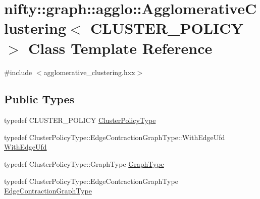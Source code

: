 \hypertarget{classnifty_1_1graph_1_1agglo_1_1AgglomerativeClustering}{}\section{nifty\+:\+:graph\+:\+:agglo\+:\+:Agglomerative\+Clustering$<$ C\+L\+U\+S\+T\+E\+R\+\_\+\+P\+O\+L\+I\+CY $>$ Class Template Reference}
\label{classnifty_1_1graph_1_1agglo_1_1AgglomerativeClustering}


{\ttfamily \#include $<$agglomerative\+\_\+clustering.\+hxx$>$}

\subsection*{Public Types}
\begin{DoxyCompactItemize}
\item 
typedef C\+L\+U\+S\+T\+E\+R\+\_\+\+P\+O\+L\+I\+CY \hyperlink{classnifty_1_1graph_1_1agglo_1_1AgglomerativeClustering_a3a678ecd37725f2c0f8ec56857768034}{Cluster\+Policy\+Type}
\item 
typedef Cluster\+Policy\+Type\+::\+Edge\+Contraction\+Graph\+Type\+::\+With\+Edge\+Ufd \hyperlink{classnifty_1_1graph_1_1agglo_1_1AgglomerativeClustering_ad271a88b3736ec7b3d6a4e47e718828a}{With\+Edge\+Ufd}
\item 
typedef Cluster\+Policy\+Type\+::\+Graph\+Type \hyperlink{classnifty_1_1graph_1_1agglo_1_1AgglomerativeClustering_a0c735105592b55c036be76e3d7fc735f}{Graph\+Type}
\item 
typedef Cluster\+Policy\+Type\+::\+Edge\+Contraction\+Graph\+Type \hyperlink{classnifty_1_1graph_1_1agglo_1_1AgglomerativeClustering_ab50801119fbdb9ed78884a64f872e1d8}{Edge\+Contraction\+Graph\+Type}
\end{DoxyCompactItemize}
